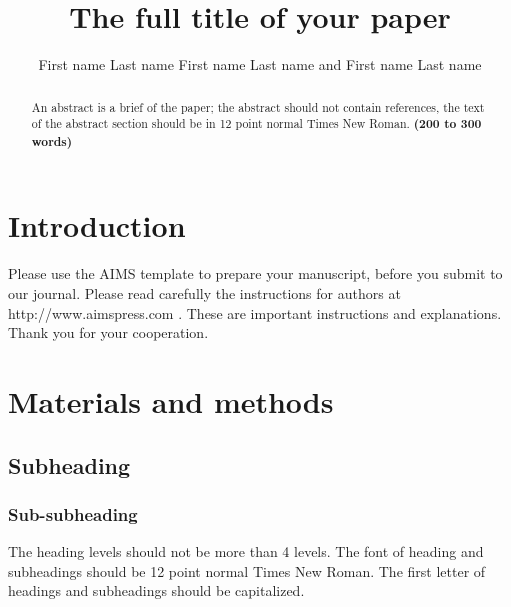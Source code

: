 \documentclass{aims}
\numberwithin{equation}{section}
\begin{document}
\title{The full title of your paper}

\author{%
  First name Last name
  First name Last name
  and
  First name Last name\corrauth
}


\address{%
  }


\begin{abstract}
An abstract is a brief of the paper; the abstract should not 
contain references, the text of the abstract section should be
in 12 point normal Times New Roman.
\textbf{(200 to 300 words)}
\end{abstract}


\maketitle

\section{Introduction}

Please use the AIMS template to prepare your manuscript, 
before you submit to our journal. 
Please read carefully the instructions for authors at
http://www.aimspress.com \cite{authour1}. 
These are important instructions and explanations. 
Thank you for your cooperation.


\section{Materials and methods}
\subsection{Subheading}

\subsubsection{Sub-subheading}
The heading levels should not be more than 4 levels. 
The font of heading and subheadings should be 12 point 
normal Times New Roman. The first letter of headings 
and subheadings should be capitalized.
\end{document}
